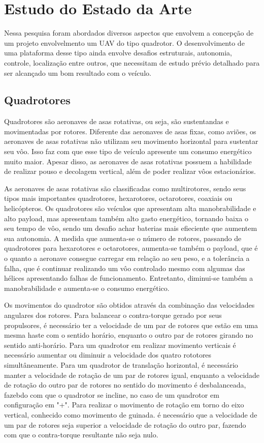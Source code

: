 \chapter{Estudo do Estado da Arte}
\label{chap:metod}
Nessa pesquisa foram abordados diversos aspectos que envolvem a concepção de um projeto envolvelmento um UAV do tipo quadrotor. O desenvolvimento de uma plataforma desse tipo ainda envolve desafios estruturais, autonomia, controle, localização entre outros, que necessitam de estudo prévio detalhado para ser alcançado um bom resultado com o veículo.

\section{Quadrotores}
Quadrotores são aeronaves de asas rotativas, ou seja, são sustentandas e movimentadas por rotores. Diferente das aeronaves de asas fixas, como aviões, os aeronaves de asas rotativas não utilizam seu movimento horizontal para sustentar seu vôo. Isso faz com que esse tipo de veículo apresente um consumo energético muito maior. Apesar disso, as aeronaves de asas rotativas possuem a habilidade de realizar pouso e decolagem vertical, além de poder realizar vôos estacionários.

As aeronaves de asas rotativas são classificadas como multirotores, sendo seus tipos mais importantes quadrotores, hexarotores, octarotores, coaxiais ou helicópteros. Os quadrotores são veículos que apresentam alta manobrabilidade e alto payload, mas apresentam também alto gasto energético, tornando baixa o seu tempo de vôo, sendo um desafio achar baterias mais efieciente que aumentem sua autonomia. A medida que aumenta-se o número de rotores, passando de quadrotores para hexarotores e octarotores, aumenta-se também o payload, que é o quanto a aeronave consegue carregar em relação ao seu peso, e a tolerância a falha, que é continuar realizando um vôo controlado mesmo com algumas das hélices apresentando falhas de funcionamento. Entretanto, diminui-se também a manobrabilidade e aumenta-se o consumo energético.


Os movimentos do quadrotor são obtidos através da combinação das velocidades angulares dos rotores. Para balancear o contra-torque gerado por seus propulsores, é necessário ter a velocidade de um par de rotores que estão em uma mesma haste com o sentido horário, enquanto o outro par de rotores girando no sentido anti-horário. Para um quadrotor em realizar movimento verticais é necessário aumentar ou diminuir a velocidade dos quatro rototores simultâneamente. Para um quadrotor de translação horizontal, é necessário manter a velocidade de rotação de um par de rotores igual, enquanto a velocidade de rotação do outro par de rotores no sentido do movimento é desbalanceada, fazebdo com que o quadrotor se incline, no caso de um quadrotor em configuração em "+". Para realizar o movimento de rotação em torno do eixo vertical, conhecido como movimento de guinada. é necessário que a velocidade de um par de rotores seja superior a velocidade de rotação do outro par, fazendo com que o contra-torque resultante não seja nulo.

